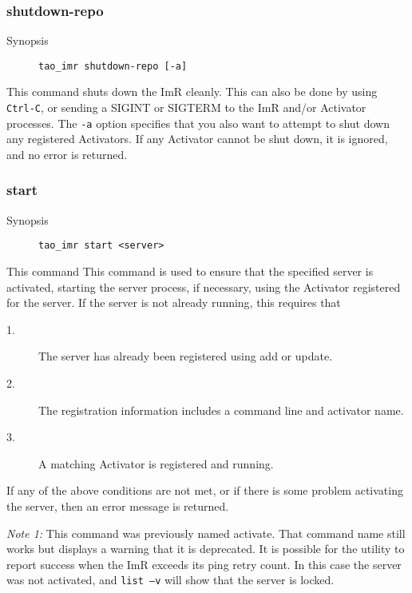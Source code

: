 \begin{itemize}
{\begin{itemize}
{{\subsubsection{shutdown-repo}

\begin{description}
    \item [Synopsis] {\tt tao\_imr shutdown-repo [-a]}
\end{description}

This command shuts down the ImR cleanly. This can also be done by 
using {\tt Ctrl-C}, or sending a SIGINT or SIGTERM to the ImR and/or 
Activator processes.   The {\tt -a} option specifies that you also want to
 attempt to shut down any registered Activators. If any Activator 
cannot be shut down, it is ignored, and no error is returned. 

\subsubsection{start}

\begin{description}
    \item [Synopsis] {\tt tao\_imr start <server>}
\end{description}

This command This command is used to ensure that the specified server 
is activated, starting the server process, if necessary, using the Activator
 registered for the server. If the server is not already running, this requires 
that

\begin{description}
\item[1.] The server has already been registered using add or update. 
\item[2.] The registration information includes a command line and activator name. 
\item[3.] A matching Activator is registered and running. 
\end{description}

If any of the above conditions are not met, or if there is some problem activating the server, 
then an error message is returned.
 
\emph {Note 1:}  This command was previously named activate.  That command name still 
works but displays a warning that it is deprecated.  It is possible for the utility to report 
success when the ImR exceeds its ping retry count. In this case the server was not activated, 
and {\tt list –v} will show that the server is locked. 

}}
\end{itemize}}
\end{itemize}
